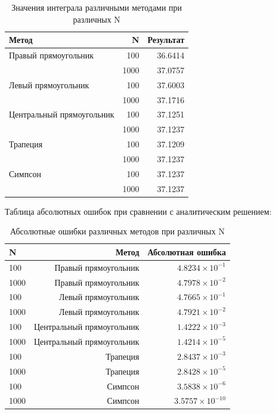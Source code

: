 \documentclass[a4paper]{article}
\begin{document}
\begin{table}[H]
\centering
\small
\begin{tabular}{lrr}
\hline
Метод & N & Результат \\
\hline
Правый прямоугольник & 100 & 36.6414 \\
& 1000 & 37.0757 \\
Левый прямоугольник & 100 & 37.6003 \\
& 1000 & 37.1716 \\
Центральный прямоугольник & 100 & 37.1251 \\
& 1000 & 37.1237 \\
Трапеция & 100 & 37.1209 \\
& 1000 & 37.1237 \\
Симпсон & 100 & 37.1237 \\
& 1000 & 37.1237 \\
\hline
\end{tabular}
\caption{Значения интеграла различными методами при различных N}
\label{tab:n_comparison}
\end{table}

Таблица абсолютных ошибок при сравнении с аналитическим решением:

\begin{table}[H]
\centering
\small
\begin{tabular}{lrr}
\hline
N & Метод & Абсолютная ошибка \\
\hline
100 & Правый прямоугольник & $4.8234 \times 10^{-1}$ \\
1000 & Правый прямоугольник & $4.7978 \times 10^{-2}$ \\
100 & Левый прямоугольник & $4.7665 \times 10^{-1}$ \\
1000 & Левый прямоугольник & $4.7921 \times 10^{-2}$ \\
100 & Центральный прямоугольник & $1.4222 \times 10^{-3}$ \\
1000 & Центральный прямоугольник & $1.4214 \times 10^{-5}$ \\
100 & Трапеция & $2.8437 \times 10^{-3}$ \\
1000 & Трапеция & $2.8428 \times 10^{-5}$ \\
100 & Симпсон & $3.5838 \times 10^{-6}$ \\
1000 & Симпсон & $3.5757 \times 10^{-10}$ \\
\hline
\end{tabular}
\caption{Абсолютные ошибки различных методов при различных N}
\label{tab:errors}
\end{table}
\end{document}
